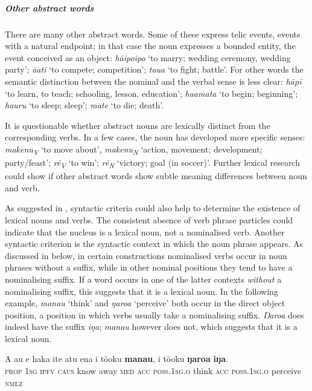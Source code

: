 \subparagraph{Other abstract words} There are many other abstract words. Some of these express telic events, events with a natural endpoint; in that case the noun expresses a bounded entity, the event conceived as an object: \textit{hāipoipo} ‘to marry; wedding ceremony, wedding party’; \textit{{\ꞌ}ā{\ꞌ}ati} ‘to compete; competition’; \textit{tau{\ꞌ}a} ‘to fight; battle’. For other words the semantic distinction between the nominal and the verbal sense is less clear: \textit{hāpī} ‘to learn, to teach; schooling, lesson, education’; \textit{ha{\ꞌ}amata} ‘to begin; beginning’; \textit{ha{\ꞌ}uru} ‘to sleep; sleep’; \textit{mate} ‘to die; death’. 

It is questionable whether abstract nouns are lexically distinct from the corresponding verbs. In a few cases, the noun has developed more specific senses: \textit{makenu}\textit{\textsubscript{V}} ‘to move about’, \textit{makenu}\textit{\textsubscript{N}} ‘action, movement; development; party/feast’; \textit{rē}\textit{\textsubscript{V}} ‘to win’; \textit{rē}\textit{\textsubscript{N}} ‘victory; goal (in soccer)’. Further lexical research could show if other abstract words show subtle meaning differences between noun and verb. 

As suggested in , syntactic criteria could also help to determine the existence of lexical nouns and verbs. The consistent absence of verb phrase particles could indicate that the nucleus is a lexical noun, not a nominalised verb. Another syntactic criterion is the syntactic context in which the noun phrase appears. As discussed in  below, in certain constructions nominalised verbs occur in noun phrases without a suffix, while in other nominal positions they tend to have a nominalising suffix. If a word occurs in one of the latter contexts \textit{without} a nominalising suffix, this suggests that it is a lexical noun. In the following example, \textit{mana{\ꞌ}u} ‘think’ and \textit{ŋaro{\ꞌ}a} ‘perceive’ both occur in the direct object position, a position in which verbs usually take a nominalising suffix. \textit{\mbox{Ŋaro{\ꞌ}a}} does indeed have the suffix \textit{iŋa}; \textit{mana{\ꞌ}u} however does not, which suggests that it is a lexical noun.

\ea\label{ex:3.14}
\gll A au e haka {\ꞌ}ite atu ena i tō{\ꞌ}oku \textbf{mana{\ꞌ}u}, i tō{\ꞌ}oku  \textbf{ŋaro{\ꞌ}a} \textbf{iŋa}.\\
\textsc{prop} \textsc{1sg} \textsc{ipfv} \textsc{caus} know away \textsc{med} \textsc{acc} \textsc{poss.1sg.o} think \textsc{acc} \textsc{poss.1sg.o}  perceive \textsc{nmlz}\\

